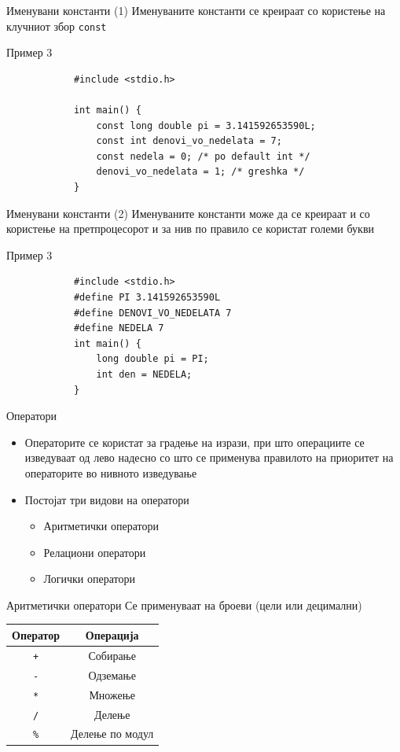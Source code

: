 \begin{frame}[fragile]{Именувани константи (1)}
\Large{Именуваните константи се креираат со користење на клучниот збор \texttt{const}}
\begin{exampleblock}{Пример 3}
		\begin{lstlisting}
			#include <stdio.h>

			int main() {
			    const long double pi = 3.141592653590L;
			    const int denovi_vo_nedelata = 7;
			    const nedela = 0; /* po default int */
			    denovi_vo_nedelata = 1; /* greshka */
			}
		\end{lstlisting}
	\end{exampleblock}
\end{frame}

\begin{frame}[fragile]{Именувани константи (2)}
Именуваните константи може да се креираат и со користење на претпроцесорот и за нив по правило се користат големи букви
	\begin{exampleblock}{Пример 3}
		\begin{lstlisting}
			#include <stdio.h>
			#define PI 3.141592653590L
			#define DENOVI_VO_NEDELATA 7
			#define NEDELA 7		
			int main() {
			    long double pi = PI;
			    int den = NEDELA;
			}
		\end{lstlisting}
	\end{exampleblock}
\end{frame}

\begin{frame}{Оператори}
\begin{itemize}
\item Операторите се користат за градење на изрази, при што операциите се изведуваат од лево надесно со што се применува правилото на приоритет на операторите во нивното изведување
\item Постојат три видови на оператори
\begin{itemize}
\item Аритметички оператори
\item Релациони оператори
\item Логички оператори
\end{itemize}
\end{itemize}
\end{frame}

\begin{frame}{Аритметички оператори}
Се применуваат на броеви (цели или децимални)
\linebreak
\begin{center}
\begin{tabular}{c|c}
\textbf{Оператор} & \textbf{Операција}\\
\hline
\texttt{+} & Собирање \\
\texttt{-} & Одземање \\
\texttt{*} & Множење \\
\texttt{/} & Делење \\
\texttt{\%} & Делење по модул
\end{tabular}
\end{center}
\end{frame}

